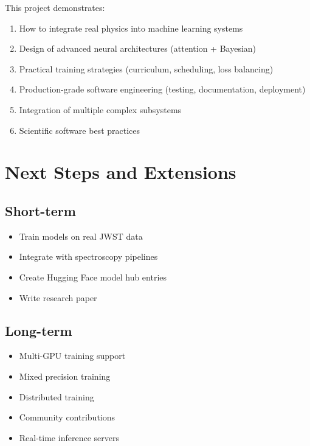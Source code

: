 \documentclass[12pt,a4paper,oneside]{report}
\begin{document}
This project demonstrates:

\begin{enumerate}
    \item How to integrate real physics into machine learning systems

    \item Design of advanced neural architectures (attention + Bayesian)

    \item Practical training strategies (curriculum, scheduling, loss balancing)

    \item Production-grade software engineering (testing, documentation, deployment)

    \item Integration of multiple complex subsystems

    \item Scientific software best practices
\end{enumerate}

\section{Next Steps and Extensions}

\subsection{Short-term}

\begin{itemize}
    \item Train models on real JWST data
    \item Integrate with spectroscopy pipelines
    \item Create Hugging Face model hub entries
    \item Write research paper
\end{itemize}

\subsection{Long-term}

\begin{itemize}
    \item Multi-GPU training support
    \item Mixed precision training
    \item Distributed training
    \item Community contributions
    \item Real-time inference servers
\end{itemize}
\end{document}
